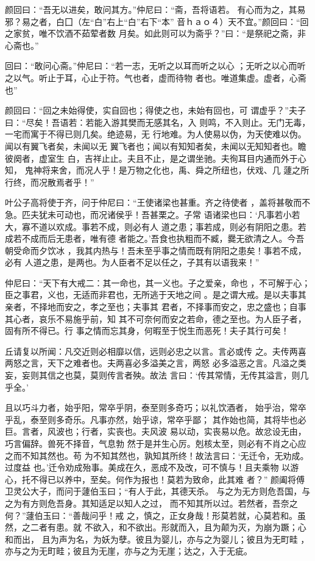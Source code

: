 \documentclass[a4paper,12pt,UTF8,twoside]{ctexbook}
\begin{document}
颜回曰：“吾无以进矣，敢问其方。”仲尼曰：“斋，吾将语若。 有心而为之，其易邪？易之者，白囗（左“白”右上“白”右下“本” 音ｈａｏ４）天不宜。”颜回曰：“回之家贫，唯不饮酒不茹荤者数 月矣。如此则可以为斋乎？”曰：“是祭祀之斋，非心斋也。”

回曰：“敢问心斋。”仲尼曰：“若一志，无听之以耳而听之以心 ；无听之以心而听之以气。听止于耳，心止于符。气也者，虚而待物 者也。唯道集虚。虚者，心斋也”

颜回曰：“回之未始得使，实自回也；得使之也，未始有回也，可 谓虚乎？”夫子曰：“尽矣！吾语若：若能入游其樊而无感其名，入 则鸣，不入则止。无门无毒，一宅而寓于不得已则几矣。绝迹易，无 行地难。为人使易以伪，为天使难以伪。闻以有翼飞者矣，未闻以无 翼飞者也；闻以有知知者矣，未闻以无知知者也。瞻彼阕者，虚室生 白，吉祥止止。夫且不止，是之谓坐驰。夫徇耳目内通而外于心知， 鬼神将来舍，而况人乎！是万物之化也，禹、舜之所纽也，伏戏、几 蘧之所行终，而况散焉者乎！”

叶公子高将使于齐，问于仲尼曰：“王使诸梁也甚重。齐之待使者 ，盖将甚敬而不急。匹夫犹未可动也，而况诸侯乎！吾甚栗之。子常 语诸梁也曰：‘凡事若小若大，寡不道以欢成。事若不成，则必有人 道之患；事若成，则必有阴阳之患。若成若不成而后无患者，唯有德 者能之。’吾食也执粗而不臧，爨无欲清之人。今吾朝受命而夕饮冰 ，我其内热与！吾未至乎事之情而既有阴阳之患矣！事若不成，必有 人道之患，是两也。为人臣者不足以任之，子其有以语我来！”

仲尼曰：“天下有大戒二：其一命也，其一义也。子之爱亲，命也 ，不可解于心；臣之事君，义也，无适而非君也，无所逃于天地之间 。是之谓大戒。是以夫事其亲者，不择地而安之，孝之至也；夫事其 君者，不择事而安之，忠之盛也；自事其心者，哀乐不易施乎前，知 其不可奈何而安之若命，德之至也。为人臣子者，固有所不得已。行 事之情而忘其身，何暇至于悦生而恶死！夫子其行可矣！

丘请复以所闻：凡交近则必相靡以信，远则必忠之以言。言必或传 之。夫传两喜两怒之言，天下之难者也。夫两喜必多溢美之言，两怒 必多溢恶之言。凡溢之类妄，妄则其信之也莫，莫则传言者殃。故法 言曰：‘传其常情，无传其溢言，则几乎全。’

且以巧斗力者，始乎阳，常卒乎阴，泰至则多奇巧；以礼饮酒者， 始乎治，常卒乎乱，泰至则多奇乐。凡事亦然，始乎谅，常卒乎鄙； 其作始也简，其将毕也必巨。言者，风波也；行者，实丧也。夫风波 易以动，实丧易以危。故忿设无由，巧言偏辞。兽死不择音，气息勃 然于是并生心厉。剋核太至，则必有不肖之心应之而不知其然也。苟 为不知其然也，孰知其所终！故法言曰：‘无迁令，无劝成。过度益 也。’迁令劝成殆事。美成在久，恶成不及改，可不慎与！且夫乘物 以游心，托不得已以养中，至矣。何作为报也！莫若为致命，此其难 者？” 颜阖将傅卫灵公大子，而问于蘧伯玉曰；“有人于此，其德天杀。 与之为无方则危吾国，与之为有方则危吾身。其知适足以知人之过， 而不知其所以过。若然者，吾奈之何？”蘧伯玉曰：“善哉问乎！戒 之，慎之，正女身哉！形莫若就，心莫若和。虽然，之二者有患。就 不欲入，和不欲出。形就而入，且为颠为灭，为崩为蹶；心和而出， 且为声为名，为妖为孽。彼且为婴儿，亦与之为婴儿；彼且为无町畦 ，亦与之为无町畦；彼且为无崖，亦与之为无崖；达之，入于无疵。
\end{document}
